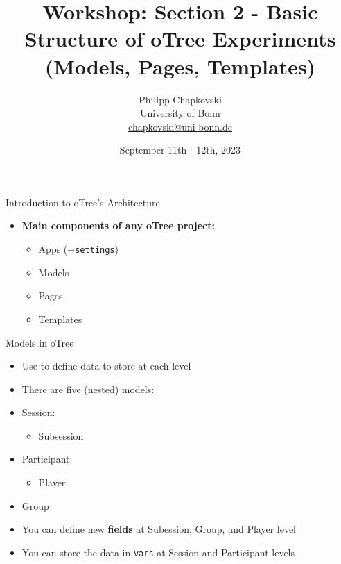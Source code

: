 \documentclass[
  ignorenonframetext,
]{beamer}
\title{Workshop: Section 2 - Basic Structure of oTree Experiments
(Models, Pages, Templates)}
\author{Philipp Chapkovski\\
University of Bonn\\
\href{mailto:chapkovski@uni-bonn.de}{chapkovski@uni-bonn.de}}
\date{September 11th - 12th, 2023}
\providecommand{\tightlist}{%
  \setlength{\itemsep}{0pt}\setlength{\parskip}{0pt}}
\begin{document}
\frame{\titlepage}

\begin{frame}[fragile]{Introduction to oTree's Architecture}
\label{introduction-to-otrees-architecture}
\begin{itemize}
\item
  \textbf{Main components of any oTree project:}

  \begin{itemize}
  \item
    Apps (+\texttt{settings})
  \item
    Models
  \item
    Pages
  \item
    Templates
  \end{itemize}
\end{itemize}
\end{frame}

\begin{frame}[fragile]{Models in oTree}
\label{models-in-otree}
\begin{itemize}
\tightlist
\item
  Use to define data to store at each level
\item
  There are five (nested) models:
\item
  Session:

  \begin{itemize}
  \tightlist
  \item
    Subsession
  \end{itemize}
\item
  Participant:

  \begin{itemize}
  \tightlist
  \item
    Player
  \end{itemize}
\item
  Group\\
\item
  You can define new \textbf{fields} at Subession, Group, and Player
  level
\item
  You can store the data in \texttt{vars} at Session and Participant
  levels
\end{itemize}
\end{frame}
\end{document}
